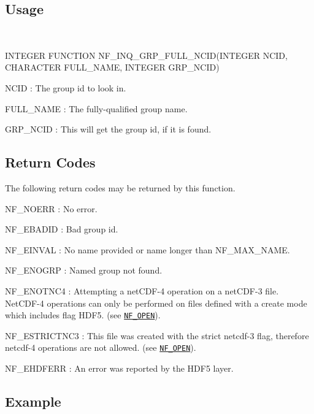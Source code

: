 \subsection*{Usage }

 

I\+N\+T\+E\+G\+ER F\+U\+N\+C\+T\+I\+ON N\+F\+\_\+\+I\+N\+Q\+\_\+\+G\+R\+P\+\_\+\+F\+U\+L\+L\+\_\+\+N\+C\+I\+D(\+I\+N\+T\+E\+G\+E\+R N\+C\+I\+D, C\+H\+A\+R\+A\+C\+T\+E\+R F\+U\+L\+L\+\_\+\+N\+A\+M\+E, I\+N\+T\+E\+G\+E\+R G\+R\+P\+\_\+\+N\+C\+I\+D)

{\ttfamily N\+C\+ID} \+: The group id to look in.

{\ttfamily F\+U\+L\+L\+\_\+\+N\+A\+ME} \+: The fully-\/qualified group name.

{\ttfamily G\+R\+P\+\_\+\+N\+C\+ID} \+: This will get the group id, if it is found.

\subsection*{Return Codes }

The following return codes may be returned by this function.

{\ttfamily N\+F\+\_\+\+N\+O\+E\+RR} \+: No error.

{\ttfamily N\+F\+\_\+\+E\+B\+A\+D\+ID} \+: Bad group id.

{\ttfamily N\+F\+\_\+\+E\+I\+N\+V\+AL} \+: No name provided or name longer than N\+F\+\_\+\+M\+A\+X\+\_\+\+N\+A\+ME.

{\ttfamily N\+F\+\_\+\+E\+N\+O\+G\+RP} \+: Named group not found.

{\ttfamily N\+F\+\_\+\+E\+N\+O\+T\+N\+C4} \+: Attempting a net\+C\+D\+F-\/4 operation on a net\+C\+D\+F-\/3 file. Net\+C\+D\+F-\/4 operations can only be performed on files defined with a create mode which includes flag H\+D\+F5. (see \href{#NF_005fOPEN}{\tt N\+F\+\_\+\+O\+P\+EN}).

{\ttfamily N\+F\+\_\+\+E\+S\+T\+R\+I\+C\+T\+N\+C3} \+: This file was created with the strict netcdf-\/3 flag, therefore netcdf-\/4 operations are not allowed. (see \href{#NF_005fOPEN}{\tt N\+F\+\_\+\+O\+P\+EN}).

{\ttfamily N\+F\+\_\+\+E\+H\+D\+F\+E\+RR} \+: An error was reported by the H\+D\+F5 layer.

\subsection*{Example }

